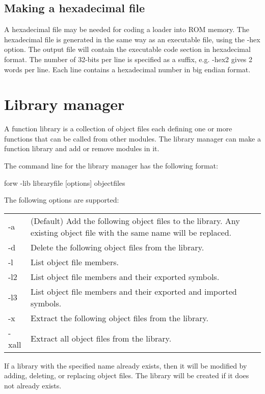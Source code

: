 \documentclass[forwardcom.tex]{subfiles}
\begin{document}
\subsection{Making a hexadecimal file} \label{makingAHexadecimalFile}
A hexadecimal file may be needed for coding a loader into ROM memory. The hexadecimal file is generated in the same way as an executable file, using the -hex option. 
The output file will contain the executable code section in hexadecimal format. The number of 32-bits per line is specified as a suffix, e.g. -hex2 gives 2 words per line. Each line contains a hexadecimal number in big endian format.
\vv


\section{Library manager} \label{libraryManager}

A function library is a collection of object files each defining one or more functions that can be called from other modules. The library manager can make a function library and add or remove modules in it.
\vv

The command line for the library manager has the following format:
\vv

\hspace{5mm} {\ttfamily forw -lib libraryfile [options] objectfiles}
\vv

The following options are supported:\\
\begin{tabular}{|p{10mm}p{150mm}|}
\hline
-a & (Default) Add the following object files to the library. Any existing object file with the same name will be replaced.\\
-d & Delete the following object files from the library.\\
-l & List object file members.\\
-l2 & List object file members and their exported symbols.\\
-l3 & List object file members and their exported and imported symbols.\\
-x & Extract the following object files from the library.\\
-xall & Extract all object files from the library. \\
\hline
\end{tabular}
\vv

If a library with the specified name already exists, then it will be modified by adding, deleting, or replacing object files. The library will be created if it does not already exists.
\vv
\end{document}
